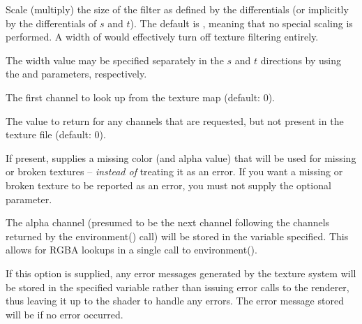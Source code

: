 \documentclass[11pt,letterpaper]{book}
\begin{document}
\vspace{12pt}
Scale (multiply) the size of the filter as defined by the differentials
(or implicitly by the differentials of $s$ and $t$).  The default is
{}, meaning that no special scaling is performed.  A width of
{} would effectively turn off texture filtering entirely.

The width value may be specified separately in the $s$ and $t$
directions by using the  and  parameters,
respectively.
\apiend
\vspace{-16pt}

\vspace{12pt}
The first channel to look up from the texture map (default: 0).
\apiend
\vspace{-16pt}

\vspace{12pt}
The value to return for any channels that are requested, but 
not present in the texture file (default: 0).
\apiend
\vspace{-16pt}

\vspace{12pt}
If present, supplies a missing color (and alpha value) that will
be used for missing or broken textures -- \emph{instead of} treating
it as an error.  If you want a missing or broken texture to be reported
as an error, you must not supply the optional 
parameter.
\apiend
\vspace{-16pt}

\vspace{12pt}
The alpha channel (presumed to be the next channel following the
channels returned by the {\cf environment()} call) will be stored in the
variable specified.  This allows for RGBA lookups in a single call to
{\cf environment()}.
\apiend
\vspace{-16pt}

\vspace{12pt}
If this option is supplied, any error messages generated by the texture
system will be stored in the specified variable rather than issuing error
calls to the renderer, thus leaving it up to the shader to handle any
errors. The error message stored will be \qkw{} if no error occurred.
\apiend
\vspace{-16pt}

\apiend
\end{document}
